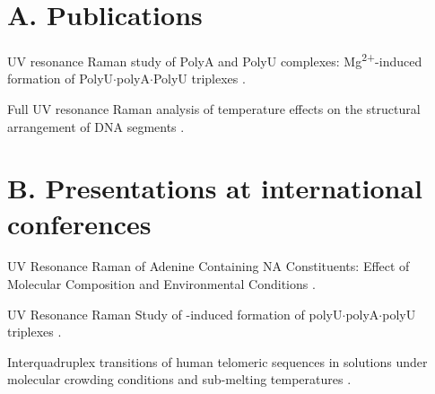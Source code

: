 
\section*{A. Publications}

\noindent
\begin{docenum}
\item UV resonance Raman study of PolyA and PolyU complexes:
	Mg\textsuperscript{2+}-induced formation of PolyU$\cdot$polyA$\cdot$PolyU
	triplexes \parencite{Klener2015}.
\item Full UV resonance Raman analysis of temperature effects on the structural
	arrangement of DNA segments \parencite{Klener2021}.
\end{docenum}
\par


\section*{B. Presentations at international conferences}

\begin{docenum}
\item UV Resonance Raman of Adenine Containing NA Constituents: Effect of
	Molecular Composition and Environmental Conditions
	\parencite{Klener2013}.
\item UV Resonance Raman Study of -induced formation of
	polyU$\cdot$polyA$\cdot$polyU triplexes
	\parencite{Klener2014}.
\item Interquadruplex transitions of human telomeric sequences in 
	solutions under molecular crowding conditions and sub-melting temperatures
	\parencite{Lindnerova-Mudronova2016}.
\end{docenum}
